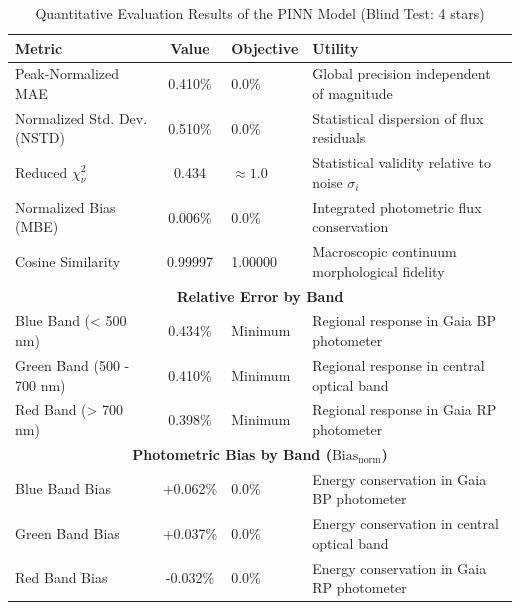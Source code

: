 
\begin{table}[htpb]
\centering
\caption{Quantitative Evaluation Results of the PINN Model (Blind Test: 4 stars)}
\label{tab:pinn_evaluation}
\begin{tabular}{lcll}
\hline
\textbf{Metric} & \textbf{Value} & \textbf{Objective} & \textbf{Utility} \\
\hline
Peak-Normalized MAE & 0.410\% & 0.0\% & Global precision independent of magnitude \\
Normalized Std. Dev. (NSTD) & 0.510\% & 0.0\% & Statistical dispersion of flux residuals \\
Reduced $\chi^2_\nu$ & 0.434 & $\approx 1.0$ & Statistical validity relative to noise $\sigma_i$ \\
Normalized Bias (MBE) & 0.006\% & 0.0\% & Integrated photometric flux conservation \\
Cosine Similarity & 0.99997 & 1.00000 & Macroscopic continuum morphological fidelity \\
\hline
\multicolumn{4}{c}{\textbf{Relative Error by Band}} \\
\hline
Blue Band (< 500 nm) & 0.434\% & Minimum & Regional response in Gaia BP photometer \\
Green Band (500 - 700 nm) & 0.410\% & Minimum & Regional response in central optical band \\
Red Band (> 700 nm) & 0.398\% & Minimum & Regional response in Gaia RP photometer \\
\hline
\multicolumn{4}{c}{\textbf{Photometric Bias by Band ($\text{Bias}_{\text{norm}}$)}} \\
\hline
Blue Band Bias & +0.062\% & 0.0\% & Energy conservation in Gaia BP photometer \\
Green Band Bias & +0.037\% & 0.0\% & Energy conservation in central optical band \\
Red Band Bias & -0.032\% & 0.0\% & Energy conservation in Gaia RP photometer \\
\hline
\end{tabular}
\end{table}
